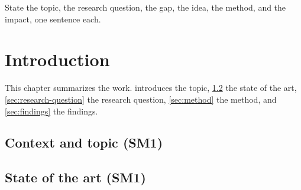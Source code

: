 \documentclass[a4paper, 11pt]{report}
\begin{document}
\makecover
\maketitlepage

\frontmatter
State the topic, the research question, the gap, the idea, the method, and the
impact, one sentence each.

\tableofcontents
\listoffigures
\listoftables

\begin{acronym}[ADC]
\end{acronym}

\mainmatter
\chapter{Introduction}
\label{ch:introduction}
This chapter summarizes the work.
 introduces the topic, \cref{sec:state-of-the-art} the state
of the art, \cref{sec:research-question} the research question,
\cref{sec:method} the method, and \cref{sec:findings} the findings.

\section{Context and topic (SM1)}
\label{sec:context}

\section{State of the art (SM1)}
\label{sec:state-of-the-art}
\end{document}
